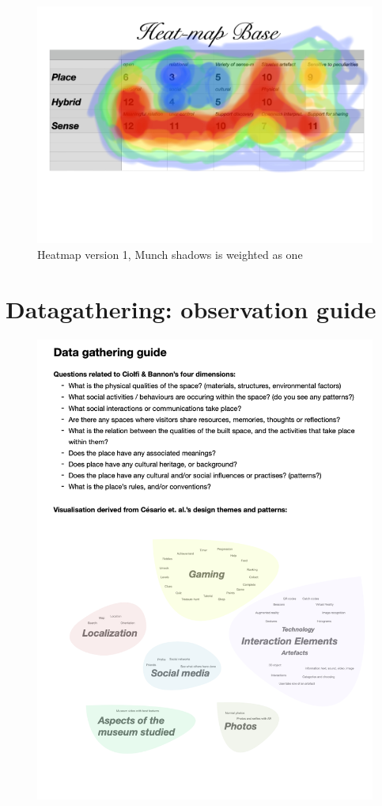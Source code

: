 \begin{figure}[H]
\includegraphics[width=12.5cm]{pictures/dataset/heatmap.jpg}
\caption{Heatmap version 1, Munch shadows is weighted as one}
\end{figure}

\section{Datagathering: observation guide}
\begin{figure}[H]
\includegraphics[width=13cm]{pictures/appendix/datagathering.png}
\centering 
\end{figure}

